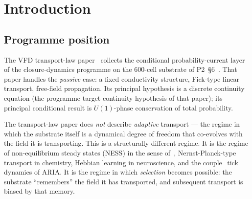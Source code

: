 \documentclass[11pt]{article}
\theoremstyle{definition}
\begin{document}
\medskip
\noindent{}

\tableofcontents

\section{Introduction}\label{sec:intro}

\subsection{Programme position}

The VFD transport-law paper~\citep{SmartTransportLaw} collects the conditional probability-current layer of the closure-dynamics programme on the $600$-cell substrate of P2~\S 6~\citep{CascadeAlgSubstrate}. That paper handles the \emph{passive} case: a fixed conductivity structure, Fick-type linear transport, free-field propagation. Its principal hypothesis is a discrete continuity equation (the programme-target continuity hypothesis of that paper); its principal conditional result is $U(1)$-phase conservation of total probability.

The transport-law paper does \emph{not} describe \emph{adaptive} transport --- the regime in which the substrate itself is a dynamical degree of freedom that co-evolves with the field it is transporting. This is a structurally different regime. It is the regime of non-equilibrium steady states (NESS) in the sense of~\citep{Prigogine1967}, Nernst-Planck-type transport in chemistry, Hebbian learning in neuroscience, and the couple\_tick dynamics of ARIA. It is the regime in which \emph{selection} becomes possible: the substrate ``remembers'' the field it has transported, and subsequent transport is biased by that memory.
\end{document}
